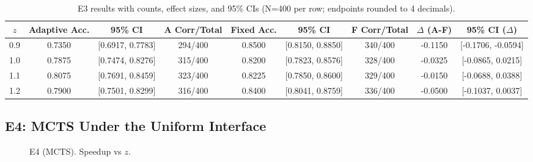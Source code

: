\begin{table}[H]
  \centering
  \caption{E3 results with counts, effect sizes, and 95\% CIs (N=400 per row; endpoints rounded to 4 decimals).}
  \vspace{0.25em}
  \begin{adjustbox}{width=\linewidth}
  \begin{tabular}{c c c c c c c c c}
    \toprule
    $z$ & Adaptive Acc. & 95\% CI & A Corr/Total & Fixed Acc. & 95\% CI & F Corr/Total & $\Delta$ (A-F) & 95\% CI ($\Delta$) \\
    \midrule
    0.9 & 0.7350 & [0.6917, 0.7783] & 294/400 & 0.8500 & [0.8150, 0.8850] & 340/400 & -0.1150 & [-0.1706, -0.0594] \\
    1.0 & 0.7875 & [0.7474, 0.8276] & 315/400 & 0.8200 & [0.7823, 0.8576] & 328/400 & -0.0325 & [-0.0865, 0.0215] \\
    1.1 & 0.8075 & [0.7691, 0.8459] & 323/400 & 0.8225 & [0.7850, 0.8600] & 329/400 & -0.0150 & [-0.0688, 0.0388] \\
    1.2 & 0.7900 & [0.7501, 0.8299] & 316/400 & 0.8400 & [0.8041, 0.8759] & 336/400 & -0.0500 & [-0.1037, 0.0037] \\
    \bottomrule
  \end{tabular}
  \end{adjustbox}
\end{table}

\subsection{E4: MCTS Under the Uniform Interface}
\begin{figure}[H]
  \centering
  \begin{adjustbox}{width=\linewidth}
  \end{adjustbox}
  \caption{E4 (MCTS). Speedup vs $z$.}
  \label{fig:e4a}
\end{figure}

